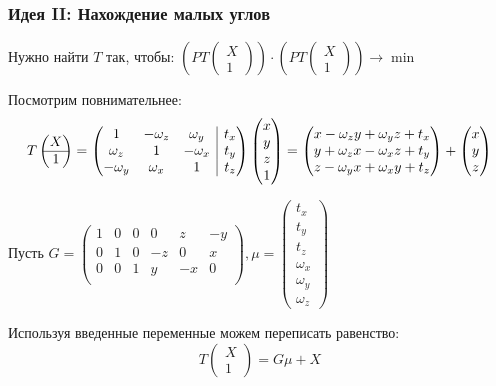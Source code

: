 \documentclass{beamer}
\begin{document}
\begin{frame}
	\frametitle{Идея II: Нахождение малых углов}
	Нужно найти $T$ так, чтобы:
	$ (P T 
	\begin{pmatrix} 
	X \\\hline
	1
	\end{pmatrix})
	\cdot
	(P T 
	\begin{pmatrix} 
	X \\\hline
	1
	\end{pmatrix}) \rightarrow \min$
	
	Посмотрим повнимательнее:
	$$T \begin{pmatrix} 
	X \\\hline
	1
	\end{pmatrix} = 
	\left(\begin{array}{@{}ccc|c@{}}
	1 & -\omega_z & \omega_y & t_x \\
	\omega_z & 1 & -\omega_x & t_y \\
	-\omega_y & \omega_x & 1 & t_z
	\end{array}\right)
	\begin{pmatrix} 
	x \\
	y \\
	z \\
	1
	\end{pmatrix} =
	\begin{pmatrix} 
	x - \omega_z y + \omega_y z + t_x \\
	y + \omega_z x - \omega_x z + t_y \\
	z - \omega_y x + \omega_x y + t_z
	\end{pmatrix} +
	\begin{pmatrix} 
	x \\
	y \\
	z
	\end{pmatrix}$$
	
	Пусть
	$G = 
	\begin{pmatrix} 
		1 & 0 & 0 &  0 &  z & -y \\
		0 & 1 & 0 & -z &  0 &  x \\
		0 & 0 & 1 &  y & -x &  0 \\
	\end{pmatrix},
	\mu = 
	\begin{pmatrix} 
		t_x \\
		t_y \\
		t_z \\
		\omega_x \\
		\omega_y \\
		\omega_z 
	\end{pmatrix}$
	
	Используя введенные переменные можем переписать равенство:
	$$T \begin{pmatrix} 
	X \\\hline
	1
	\end{pmatrix} = G \mu + X$$
\end{frame}
\end{document}
